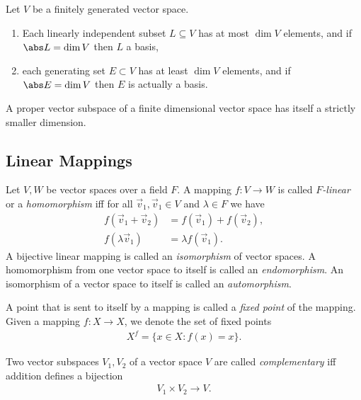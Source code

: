 \documentclass{article}
\begin{document}
\begin{corollary}[Corollary 1.6.7]
	Let $V$ be a finitely generated vector space.
	\begin{enumerate}
		\item Each linearly independent subset $L\subseteq V$ has at most
		      $\dim V$ elements, and if $\abs L=\dim V$ then $L$ a basis,
		\item each generating set $E\subset V$ has at least $\dim V$ elements,
		      and if $\abs E=\dim V$ then $E$ is actually a basis.
	\end{enumerate}
\end{corollary}

\begin{corollary}[Corollary 1.6.8]
	A proper vector subspace of a finite dimensional vector space has itself a
	strictly smaller dimension.
\end{corollary}

\subsection{Linear Mappings}

\begin{definition}
	Let $V,W$ be vector spaces over a field $F$. A mapping $f:V\to W$ is called
	\emph{$F$-linear} or a \emph{homomorphism} iff for all $\vec v_1,\vec v_1\in V$ and $\lambda \in F$ we
	have
	\begin{align*}
		f(\vec v_1+\vec v_2) & = f(\vec v_1) + f(\vec v_2), \\
		f(\lambda \vec v_1)  & = \lambda f(\vec v_1).
	\end{align*}
	A bijective linear mapping is called an \emph{isomorphism} of vector spaces.
	A homomorphism from one vector space to itself is called an \emph{endomorphism}.
	An isomorphism of a vector space to itself is called an \emph{automorphism}.
\end{definition}

\begin{definition}
	A point that is sent to itself by a mapping is called a \emph{fixed point} of
	the mapping. Given a mapping $f:X\to X$, we denote the set of fixed points
	\begin{align*}
		X^f = \{x\in X : f(x)=x\}.
	\end{align*}
\end{definition}

\begin{definition}
	Two vector subspaces $V_1,V_2$ of a vector space $V$ are called \emph{complementary}
	iff addition defines a bijection
	\begin{align*}
		V_1\times V_2 \to V.
	\end{align*}
\end{definition}
\end{document}
